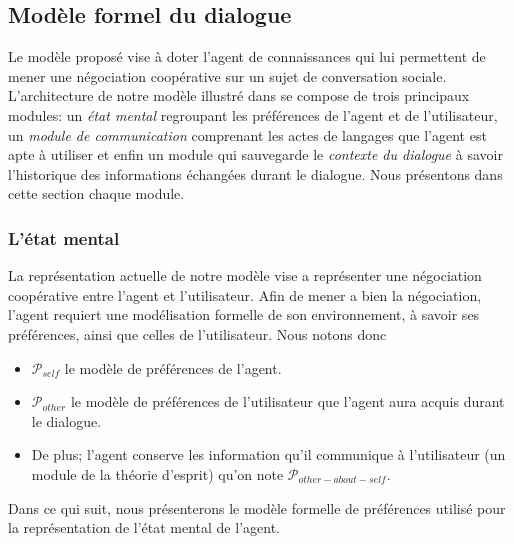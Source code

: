 \documentclass [french]{sig-alternate-05-2015}
\begin{document}
\subsection{Modèle formel du dialogue}
\par Le modèle proposé vise à doter l'agent de connaissances qui lui permettent de mener une négociation coopérative sur un sujet de conversation sociale. L'architecture de notre modèle illustré dans
 se compose de trois principaux modules: un \textit{état mental} regroupant les préférences de l'agent et de l'utilisateur, un \textit{module de communication} comprenant les actes de langages que l'agent est apte à utiliser et enfin un module qui sauvegarde le \textit{contexte du dialogue} à savoir l'historique des informations échangées durant le dialogue. Nous présentons dans cette section chaque module.


\subsubsection{L'état mental}
\par La représentation actuelle de notre modèle vise a représenter une négociation coopérative entre l'agent et l'utilisateur. Afin de mener a bien la négociation, l'agent requiert une modélisation formelle de son environnement, à savoir ses préférences, ainsi que celles de l'utilisateur. Nous notons donc
 \begin{itemize}
 	\item  $\mathcal{P}_{self}$ le modèle de préférences de l'agent.
 	\item $\mathcal{P}_{other}$ le modèle de préférences de l'utilisateur que l'agent aura acquis durant le dialogue.
 	\item De plus; l'agent conserve les information qu'il communique à l'utilisateur (un module de la théorie d'esprit) qu'on note $\mathcal{P}_{other-about-self}$.
 \end{itemize}

 \par Dans ce qui suit, nous présenterons le modèle formelle de préférences utilisé pour la représentation de l'état mental de l'agent.
\\
\end{document}
